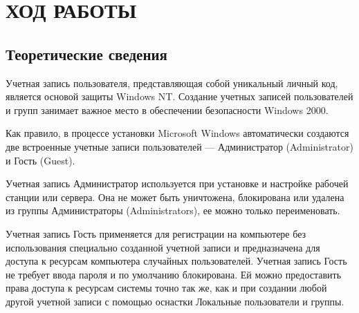 \section{ХОД РАБОТЫ}
\subsection{Теоретические сведения}

Учетная запись пользователя, представляющая собой уникальный личный код,
является основой защиты Windows NT. Создание учетных записей пользователей
и групп занимает важное место в обеспечении безопасности Windows 2000.

Как правило, в процессе установки Microsoft Windows автоматически
создаются две встроенные учетные записи пользователей --- Администратор (Administrator)
и Гость (Guest).

Учетная запись Администратор  используется при установке
и настройке рабочей станции или сервера. Она не может быть уничтожена,
блокирована или удалена из группы Администраторы (Administrators),
ее можно только переименовать.

Учетная запись Гость применяется для регистрации на компьютере без использования
специально созданной учетной записи и предназначена для доступа к ресурсам
компьютера случайных пользователей. Учетная запись Гость не требует ввода пароля
и по умолчанию блокирована. Ей можно предоставить права доступа к ресурсам системы
точно так же, как и при создании любой другой учетной записи с помощью
оснастки Локальные пользователи и группы.

